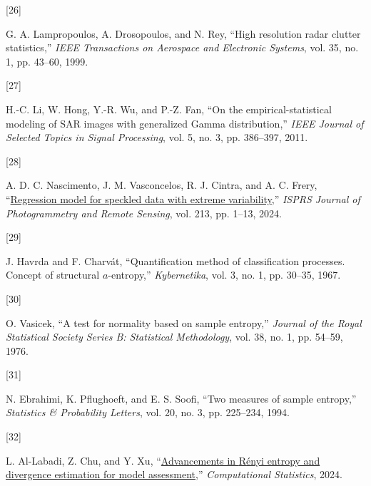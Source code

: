 \documentclass[
  lettersize  journal,
]{IEEEtran}%
\newlength{\cslhangindent}
\newlength{\csllabelwidth}
\newenvironment{CSLReferences}[2] %
 {\begin{list}{}{%
  \setlength{\itemindent}{0pt}
  \setlength{\leftmargin}{0pt}
  \setlength{\parsep}{0pt}
  \ifodd #1
   \setlength{\leftmargin}{\cslhangindent}
   \setlength{\itemindent}{-1\cslhangindent}
  \fi
  \setlength{\itemsep}{#2\baselineskip}}}
 {\end{list}}
\newcommand{\CSLLeftMargin}[1]{\parbox[t]{\csllabelwidth}{\strut#1\strut}}
\newcommand{\CSLRightInline}[1]{\parbox[t]{\linewidth - \csllabelwidth}{\strut#1\strut}}
\providecommand{\DIFaddbegin}{} %
\providecommand{\DIFaddend}{} %
\providecommand{\DIFdelbegin}{} %
\providecommand{\DIFdelend}{} %
\providecommand{\DIFscaledelfig}{0.5}
\newlength{\DIFdelgraphicswidth} %
\newlength{\DIFdelgraphicsheight} %
\providecommand{\DIFaddincludegraphics}[2][]{{\color{blue}\fbox{\DIFOincludegraphics[#1]{#2}}}} %
\providecommand{\DIFdelincludegraphics}[2][]{%
\sbox{\DIFdelgraphicsbox}{\DIFOincludegraphics[#1]{#2}}%
\settoboxwidth{\DIFdelgraphicswidth}{\DIFdelgraphicsbox} %
\settoboxtotalheight{\DIFdelgraphicsheight}{\DIFdelgraphicsbox} %
\scalebox{\DIFscaledelfig}{%
\parbox[b]{\DIFdelgraphicswidth}{\usebox{\DIFdelgraphicsbox}\\[-\baselineskip] \rule{\DIFdelgraphicswidth}{0em}}\llap{\resizebox{\DIFdelgraphicswidth}{\DIFdelgraphicsheight}{%
\setlength{\unitlength}{\DIFdelgraphicswidth}%
\begin{picture}(1,1)%
\thicklines\linethickness{2pt} %
{\color[rgb]{1,0,0}\put(0,0){\framebox(1,1){}}}%
{\color[rgb]{1,0,0}\put(0,0){\line( 1,1){1}}}%
{\color[rgb]{1,0,0}\put(0,1){\line(1,-1){1}}}%
\end{picture}%
}\hspace*{3pt}}} %
} %
\DeclareRobustCommand{\DIFaddbegin}{\DIFOaddbegin \let\includegraphics\DIFaddincludegraphics} %
\DeclareRobustCommand{\DIFaddend}{\DIFOaddend \let\includegraphics\DIFOincludegraphics} %
\DeclareRobustCommand{\DIFdelbegin}{\DIFOdelbegin \let\includegraphics\DIFdelincludegraphics} %
\DeclareRobustCommand{\DIFdelend}{\DIFOaddend \let\includegraphics\DIFOincludegraphics} %
\begin{document}
\begin{CSLReferences}{0}{0}
\DIFdelbegin %
\DIFdelend \DIFaddbegin \CSLLeftMargin{{[}26{]} }\DIFaddend %
\CSLRightInline{G. A. Lampropoulos, A. Drosopoulos, and N. Rey, {``High
resolution radar clutter statistics,''} \emph{IEEE Transactions on
Aerospace and Electronic Systems}, vol. 35, no. 1, pp. 43--60, 1999. }

\DIFdelbegin %
\DIFdelend \DIFaddbegin \CSLLeftMargin{{[}27{]} }\DIFaddend %
\CSLRightInline{H.-C. Li, W. Hong, Y.-R. Wu, and P.-Z. Fan, {``On the
empirical-statistical modeling of {SAR} images with generalized {G}amma
distribution,''} \emph{IEEE Journal of Selected Topics in Signal
Processing}, vol. 5, no. 3, pp. 386--397, 2011. }

\DIFdelbegin %
\DIFdelend \DIFaddbegin \CSLLeftMargin{{[}28{]} }\DIFaddend %
\CSLRightInline{A. D. C. Nascimento, J. M. Vasconcelos, R. J. Cintra,
and A. C. Frery,
{``\href{https://doi.org/10.1016/j.isprsjprs.2024.05.009}{Regression
model for speckled data with extreme variability},''} \emph{ISPRS
Journal of Photogrammetry and Remote Sensing}, vol. 213, pp. 1--13,
2024. }

\DIFdelbegin %
\DIFdelend \DIFaddbegin \CSLLeftMargin{{[}29{]} }\DIFaddend %
\CSLRightInline{J. Havrda and F. Charvát, {``Quantification method of
classification processes. Concept of structural \(a\)-entropy,''}
\emph{Kybernetika}, vol. 3, no. 1, pp. 30--35, 1967. }

\DIFdelbegin %
\DIFdelend \DIFaddbegin \CSLLeftMargin{{[}30{]} }\DIFaddend %
\CSLRightInline{O. Vasicek, {``A test for normality based on sample
entropy,''} \emph{Journal of the Royal Statistical Society Series B:
Statistical Methodology}, vol. 38, no. 1, pp. 54--59, 1976. }

\DIFdelbegin %
\DIFdelend \DIFaddbegin \CSLLeftMargin{{[}31{]} }\DIFaddend %
\CSLRightInline{N. Ebrahimi, K. Pflughoeft, and E. S. Soofi, {``Two
measures of sample entropy,''} \emph{Statistics \& Probability Letters},
vol. 20, no. 3, pp. 225--234, 1994. }

\DIFdelbegin %
\DIFdelend \DIFaddbegin \CSLLeftMargin{{[}32{]} }\DIFaddend %
\CSLRightInline{L. Al-Labadi, Z. Chu, and Y. Xu,
{``\href{https://doi.org/10.1007/s00180-024-01507-z}{Advancements in
{R}ényi entropy and divergence estimation for model assessment},''}
\emph{Computational Statistics}, 2024. }


\end{CSLReferences}
\end{document}
